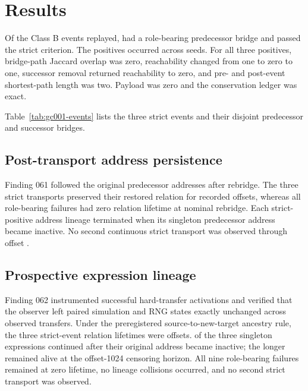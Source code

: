 \section{Results}
\label{sec:results}

\GCOneStatement

Of the \GCOneClassBEvents{} Class B events replayed,
\GCOneRoleBearingEvents{} had a role-bearing predecessor bridge and
\GCOneStrictEvents{} passed the strict criterion. The positives occurred across
\GCOneSeedCount{} seeds. For all three positives, bridge-path Jaccard overlap
was zero, reachability changed from one to zero to one, successor removal
returned reachability to zero, and pre- and post-event shortest-path length was
two. Payload was zero and the conservation ledger was exact.

Table~\ref{tab:gc001-events} lists the three strict events and their disjoint
predecessor and successor bridges.



\subsection{Post-transport address persistence}

Finding 061 followed the original predecessor addresses after rebridge. The
three strict transports preserved their restored relation for
\GCTwoLifetimes{} recorded offsets, whereas all \GCTwoFailureCount{}
role-bearing failures had zero relation lifetime at nominal rebridge. Each
strict-positive address lineage terminated when its singleton predecessor
address became inactive. No second continuous strict transport was observed
through offset \GCTwoHorizon{}.

\subsection{Prospective expression lineage}

Finding 062 instrumented successful hard-transfer activations and verified that
the observer left paired simulation and RNG states exactly unchanged across
\GCThreeEquivalenceEvents{} observed transfers. Under the preregistered
source-to-new-target ancestry rule, the three strict-event relation lifetimes
were \GCThreeLifetimes{} offsets. \GCThreeSurvivalCount{} of the three
singleton expressions continued after their original address became inactive;
the longer remained alive at the offset-1024 censoring horizon. All nine
role-bearing failures remained at zero lifetime, no lineage collisions occurred,
and no second strict transport was observed.

